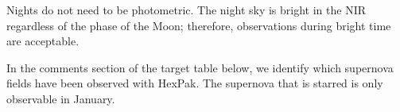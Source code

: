 \documentclass[11pt]{article}
\begin{document}
Nights do not need to be photometric. 
The night sky is bright in the NIR regardless of the phase of the Moon; therefore, observations during bright time are acceptable. 

In the comments section of the target table below, we identify which supernova fields have been observed with HexPak.
The supernova that is starred is only observable in January. 

%
%

\begin{configuration}
\grating{}
\order{}
\crossdisperser{}       
\slit{}
\multislit{}            
\wstart{}
\wend{}
\cable{}
\corrector{}            
\collimator{}             
\adc{}
\end{configuration}



%
%
\end{document}
